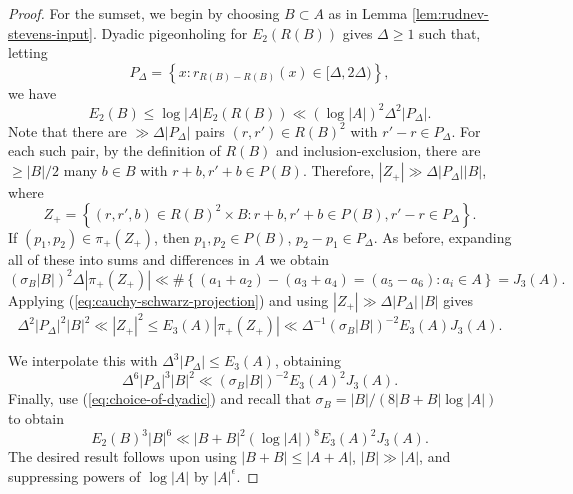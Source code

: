 \documentclass{amsart}
\numberwithin{equation}{section}
\newcommand{\De}{\Delta}
\newcommand{\e}{\epsilon}
\begin{document}
\begin{proof}
    \bigskip
    For the sumset, we begin by choosing \(B \subset A\) as in Lemma \ref{lem:rudnev-stevens-input}. Dyadic pigeonholing for \(E_2(R(B))\) gives \(\Delta \geq 1\) such that, letting 
    \[
    P_{\Delta} = \left\{ x : r_{R(B) - R(B)} (x) \in [\Delta, 2 \Delta) \right\},
    \]
    we have
    \begin{equation} 
    \label{eq:choice-of-dyadic}
        E_2(B) \leq \log \left\lvert A \right\rvert E_2(R(B)) \ll \left( \log \left\lvert A \right\rvert  \right) ^{2} \Delta ^{2} \left\lvert P_{\Delta} \right\rvert  .
    \end{equation}
    Note that there are \(\gg \De |P_{\De}|\) pairs \((r,r') \in R(B) ^2\) with \(r'-r \in P_{\De}\). 
    For each such pair, by the definition of \(R(B)\) and inclusion-exclusion, there are \(\geq |B| /2\) many \(b \in B\) with \(r + b, r' + b \in P(B)\). 
    Therefore, \(\left\lvert Z_{+}  \right\rvert \gg \Delta \left\lvert P_{\Delta}  \right\rvert  \left\lvert B \right\rvert \), where
    \[
        Z_{+} = \left\{ (r,r',b)\in R(B)^{2}\times B : r+b,r'+b \in P(B), r'-r \in P_{\Delta}  \right\} 
    .\]
    If \((p_1,p_2) \in \pi_{+} (Z_{+} )\), then \(p_1,p_2 \in P(B)\), \(p_2-p_1 \in P_{\Delta} \). As before, expanding all of these into sums and differences in \(A\) we obtain 
    \[
        \left( \sigma_{B} \left\lvert B \right\rvert  \right) ^{2} \Delta \left\lvert \pi_{+} (Z_{+} )  \right\rvert \ll \# \left\{ (a_1 + a_2) - (a_3 + a_4) = (a_5 - a_6) : a_{i}\in A \right\} = J_3(A)
    .\]
    Applying (\ref{eq:cauchy-schwarz-projection}) and using \(|Z_+| \gg \De |P_{\De}|\, |B|\) gives
    \begin{equation*}
        \Delta ^{2} \left\lvert P_{\Delta} \right\rvert ^{2} \left\lvert B \right\rvert ^{2} \ll \left\lvert Z_{+}  \right\rvert ^{2} \leq E_3(A) \left\lvert \pi_{+} (Z_{+} ) \right\rvert \ll \Delta ^{-1} (\sigma _B |B| ) ^{-2} E_3(A) J_3(A).
    \end{equation*}
    
    We interpolate this with  $\Delta ^{3} \left\lvert P_{\Delta}  \right\rvert \leq E_3(A)$, obtaining 
    \[
    \De ^6 |P_{\De}|^3 |B| ^2 \ll  (\sigma _B |B|)^{-2} E_3(A)^2 J_3(A)
    .\]
    Finally, use (\ref{eq:choice-of-dyadic}) and recall that \(\sigma_B = |B| / (8 |B+B| \log |A|)\) to obtain
    \[
    E_2(B) ^{3} \left\lvert B \right\rvert ^{6} \ll \left\lvert B+B \right\rvert ^{2} \left( \log \left\lvert A \right\rvert  \right) ^{8} E_3(A)^{2} J_3(A)
    .\]
    The desired result follows upon using \(\left\lvert B+B \right\rvert \leq \left\lvert A+A \right\rvert \), \(\left\lvert B \right\rvert \gg \left\lvert A \right\rvert \), and suppressing powers of \(\log \left\lvert A \right\rvert \) by \(\left\lvert A \right\rvert ^{\e}\).
\end{proof}
\end{document}
